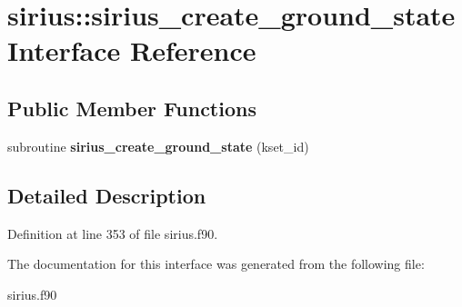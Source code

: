 \hypertarget{interfacesirius_1_1sirius__create__ground__state}{}\section{sirius\+:\+:sirius\+\_\+create\+\_\+ground\+\_\+state Interface Reference}
\label{interfacesirius_1_1sirius__create__ground__state}
\subsection*{Public Member Functions}
\begin{DoxyCompactItemize}
\item 
\hypertarget{interfacesirius_1_1sirius__create__ground__state_a0ac87156a2fc36684ee59172ea3d8fd4}{}subroutine {\bfseries sirius\+\_\+create\+\_\+ground\+\_\+state} (kset\+\_\+id)\label{interfacesirius_1_1sirius__create__ground__state_a0ac87156a2fc36684ee59172ea3d8fd4}

\end{DoxyCompactItemize}


\subsection{Detailed Description}


Definition at line 353 of file sirius.\+f90.



The documentation for this interface was generated from the following file\+:\begin{DoxyCompactItemize}
\item 
sirius.\+f90\end{DoxyCompactItemize}
